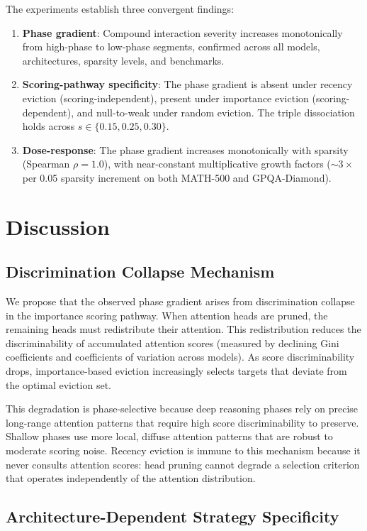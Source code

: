 \documentclass[11pt,a4paper]{article}
\begin{document}
The experiments establish three convergent findings:
\begin{enumerate}
    \item \textbf{Phase gradient}: Compound interaction severity increases monotonically from high-phase to low-phase segments, confirmed across all models, architectures, sparsity levels, and benchmarks.
    \item \textbf{Scoring-pathway specificity}: The phase gradient is absent under recency eviction (scoring-independent), present under importance eviction (scoring-dependent), and null-to-weak under random eviction. The triple dissociation holds across $s \in \{0.15, 0.25, 0.30\}$.
    \item \textbf{Dose-response}: The phase gradient increases monotonically with sparsity (Spearman $\rho = 1.0$), with near-constant multiplicative growth factors ($\sim 3\times$ per 0.05 sparsity increment on both MATH-500 and GPQA-Diamond).
\end{enumerate}

\section{Discussion}

\subsection{Discrimination Collapse Mechanism}

We propose that the observed phase gradient arises from discrimination collapse in the importance scoring pathway. When attention heads are pruned, the remaining heads must redistribute their attention. This redistribution reduces the discriminability of accumulated attention scores (measured by declining Gini coefficients and coefficients of variation across models). As score discriminability drops, importance-based eviction increasingly selects targets that deviate from the optimal eviction set.

This degradation is phase-selective because deep reasoning phases rely on precise long-range attention patterns that require high score discriminability to preserve. Shallow phases use more local, diffuse attention patterns that are robust to moderate scoring noise. Recency eviction is immune to this mechanism because it never consults attention scores: head pruning cannot degrade a selection criterion that operates independently of the attention distribution.

\subsection{Architecture-Dependent Strategy Specificity}
\end{document}
